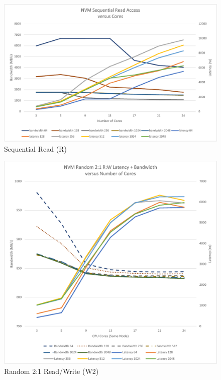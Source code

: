 \begin{figure}
    \centering
    \caption{Sequential Read (R)}\label{chart:sequential:read}
    \includegraphics[scale=0.5]{charts/sequential-r-crop.pdf}
\end{figure}

\begin{figure}
    \centering
    \caption{Random 2:1 Read/Write (W2)}\label{chart:random:W2}
    \includegraphics[scale=0.5]{charts/random-w2-crop.pdf}
\end{figure}

